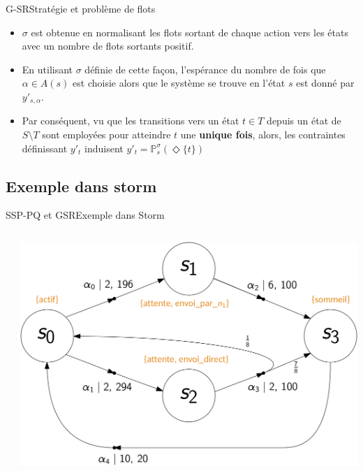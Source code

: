 \documentclass[compress]{beamer}
\theoremstyle{theorem}%
\begin{document}
\begin{frame}{G-SR}{Stratégie et problème de flots}
  \begin{itemize}
    \item $\sigma$ est obtenue en normalisant les flots sortant de chaque action vers les états avec un nombre de flots sortants positif.
    \item En utilisant $\sigma$ définie de cette façon, l'espérance du nombre de fois que $\alpha \in A(s)$ est choisie alors que le système se trouve en l'état $s$ est donné par $y'_{s, \alpha}$.
    \item Par conséquent, vu que les transitions vers un état $t \in T$ depuis un état de $S \setminus T$ sont employées pour atteindre $t$ une \textbf{unique fois}, alors, les contraintes définissant $y'_t$ induisent $y'_t = \mathbb{P}_s^\sigma(\Diamond \{t\})$
  \end{itemize}
\end{frame}

\subsection{Exemple dans storm}
\begin{frame}{SSP-PQ et GSR}{Exemple dans Storm}
  \scriptsize
  \begin{columns}
    \begin{column}{0.5\linewidth}
  
    \end{column}
    \begin{column}{0.5\linewidth}
      \begin{center}
        \includegraphics[width=\linewidth]{resources/mdmdp2}
      \end{center}
    \end{column}
  \end{columns}
\end{frame}
\end{document}
